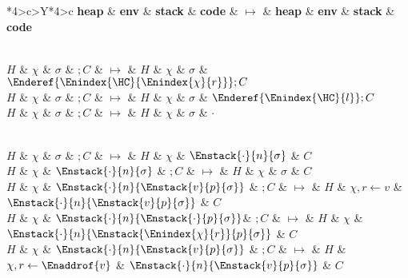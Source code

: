 \begin{xltabular}{\textwidth}{*{4}{>{\scriptsize}c}>{\tiny\bfseries}Y*{4}{>{\scriptsize}c}}
	\toprule
	{\footnotesize \bfseries heap} & {\footnotesize \bfseries env} & {\footnotesize \bfseries stack} & {\footnotesize \bfseries code} & $\bm{\mapsto}$ & {\footnotesize \bfseries heap} & {\footnotesize \bfseries env} & {\footnotesize \bfseries stack} & {\footnotesize \bfseries code} \\
	\midrule \endhead

	 \\



	$H$ & $\chi$ & $\sigma$ & $; C$ & $\bm{\mapsto}$ & $H$ & $\chi$ & $\sigma$ & $\Enderef{\Enindex{\HC}{\Enindex{\chi}{r}}}; C$ \\
	$H$ & $\chi$ & $\sigma$ & $; C$ & $\bm{\mapsto}$ & $H$ & $\chi$ & $\sigma$ & $\Enderef{\Enindex{\HC}{l}}; C$ \\

	$H$ & $\chi$ & $\sigma$ & \Inhalt$; C$ & $\bm{\mapsto}$ & $H$ & $\chi$ & $\sigma$ & $\cdot$ \\

	\midrule

	 \\

	$H$ & $\chi$ & $\sigma$ & $; C$ & $\bm{\mapsto}$ & $H$ & $\chi$ & $\Enstack{\cdot}{n}{\sigma}$ & $C$ \\
	$H$ & $\chi$ & $\Enstack{\cdot}{n}{\sigma}$ & $; C$ & $\bm{\mapsto}$ & $H$ & $\chi$ & $\sigma$ & $C$ \\
	$H$ & $\chi$ & $\Enstack{\cdot}{n}{\Enstack{v}{p}{\sigma}}$ & $; C$ & $\bm{\mapsto}$ & $H$ & $\chi, {r}\gets{v}$ & $\Enstack{\cdot}{n}{\Enstack{v}{p}{\sigma}}$ & $C$ \\
	$H$ & $\chi$ & $\Enstack{\cdot}{n}{\Enstack{\cdot}{p}{\sigma}}$& $; C$ & $\bm{\mapsto}$ & $H$ & $\chi$ & $\Enstack{\cdot}{n}{\Enstack{\Enindex{\chi}{r}}{p}{\sigma}}$ & $C$ \\
	$H$ & $\chi$ & $\Enstack{\cdot}{n}{\Enstack{v}{p}{\sigma}}$ & $; C$ & $\bm{\mapsto}$ & $H$ & $\chi, {r}\gets{\Enaddrof{v}}$ & $\Enstack{\cdot}{n}{\Enstack{v}{p}{\sigma}}$ & $C$ \\

	\midrule

	 \\


\end{xltabular}
